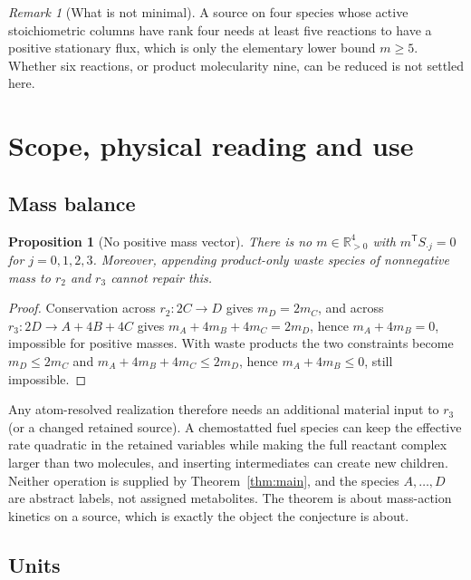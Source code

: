 \documentclass[11pt,a4paper]{article}
\theoremstyle{plain}
\newtheorem{proposition}[theorem]{Proposition}
\theoremstyle{definition}
\theoremstyle{remark}
\newtheorem{remark}[theorem]{Remark}
\newcommand{\R}{\mathbb{R}}
\begin{document}
\begin{remark}[What is not minimal]
A source on four species whose active stoichiometric columns have rank four needs at least five reactions to have a positive stationary flux, which is only the elementary lower bound $m\ge5$. Whether six reactions, or product molecularity nine, can be reduced is not settled here.
\end{remark}

\section{Scope, physical reading and use}\label{sec:scope}

\subsection{Mass balance}\label{sec:mass}

\begin{proposition}[No positive mass vector]\label{prop:mass}
There is no $m\in\R^4_{>0}$ with $m^{\mathsf T}S_{\cdot j}=0$ for $j=0,1,2,3$. Moreover, appending product-only waste species of nonnegative mass to $r_2$ and $r_3$ cannot repair this.
\end{proposition}

\begin{proof}
Conservation across $r_2\colon2C\to D$ gives $m_D=2m_C$, and across $r_3\colon2D\to A+4B+4C$ gives $m_A+4m_B+4m_C=2m_D$, hence $m_A+4m_B=0$, impossible for positive masses. With waste products the two constraints become $m_D\le2m_C$ and $m_A+4m_B+4m_C\le2m_D$, hence $m_A+4m_B\le0$, still impossible.
\end{proof}

Any atom-resolved realization therefore needs an additional material input to $r_3$ (or a changed retained source). A chemostatted fuel species can keep the effective rate quadratic in the retained variables while making the full reactant complex larger than two molecules, and inserting intermediates can create new children. Neither operation is supplied by Theorem~\ref{thm:main}, and the species $A,\dots,D$ are abstract labels, not assigned metabolites. The theorem is about mass-action kinetics on a source, which is exactly the object the conjecture is about.

\subsection{Units}\label{sec:units}
\end{document}
